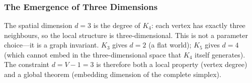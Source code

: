 \documentclass[11pt,a4paper]{book}
\begin{document}
\begin{code}
\AgdaSymbol{=}\AgdaSpace{}%
\<%
\\
\>[0]\AgdaSpace{}%
\AgdaSpace{}%
\AgdaSpace{}%
\AgdaSymbol{=}\AgdaSpace{}%
\<%
\\
\>[0]\AgdaSpace{}%
\AgdaSpace{}%
\AgdaSpace{}%
\AgdaSymbol{=}\AgdaSpace{}%
\<%
\\
\>[0]\AgdaSpace{}%
\AgdaSpace{}%
\AgdaSpace{}%
\AgdaSymbol{=}\AgdaSpace{}%
\<%
\\
\>[0]\AgdaSpace{}%
\AgdaSpace{}%
\AgdaSpace{}%
\AgdaSymbol{=}\AgdaSpace{}%
\<%
\\
\>[0]\AgdaSpace{}%
\AgdaSpace{}%
\AgdaSpace{}%
\AgdaSymbol{=}\AgdaSpace{}%
\<%
\\
\>[0]\AgdaSpace{}%
\AgdaSpace{}%
\AgdaSpace{}%
\AgdaSymbol{=}\AgdaSpace{}%
\<%
\\
\>[0]\AgdaSpace{}%
\AgdaSpace{}%
\AgdaSpace{}%
\AgdaSymbol{=}\AgdaSpace{}%
\<%
\\
\>[0]\AgdaSpace{}%
\AgdaSpace{}%
\AgdaSpace{}%
\AgdaSymbol{=}\AgdaSpace{}%
\<%
\end{code}

\subsubsection*{The Emergence of Three Dimensions}

The spatial dimension $d = 3$ is the degree of $K_4$: each vertex has
exactly three neighbours, so the local structure is three-dimensional.
This is not a parameter choice---it is a graph invariant.  $K_3$ gives
$d = 2$ (a flat world); $K_5$ gives $d = 4$ (which cannot embed in the
three-dimensional space that $K_4$ itself generates).  The constraint
$d = V - 1 = 3$ is therefore both a local property (vertex degree) and
a global theorem (embedding dimension of the complete simplex).
\end{document}
